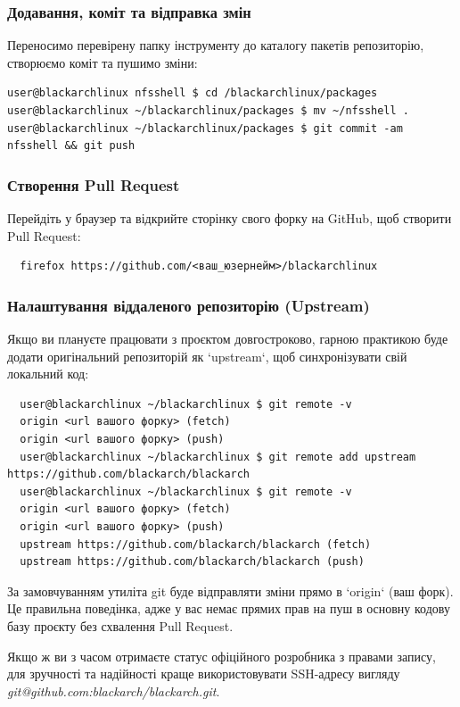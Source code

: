 \documentclass[a4paper, oneside, 11pt]{book}
\begin{document}
\subsubsection{Додавання, коміт та відправка змін}
Переносимо перевірену папку інструменту до каталогу пакетів репозиторію, створюємо коміт та пушимо зміни:
\begin{lstlisting}
user@blackarchlinux nfsshell $ cd /blackarchlinux/packages
user@blackarchlinux ~/blackarchlinux/packages $ mv ~/nfsshell .
user@blackarchlinux ~/blackarchlinux/packages $ git commit -am nfsshell && git push
\end{lstlisting}

\subsubsection{Створення Pull Request}
Перейдіть у браузер та відкрийте сторінку свого форку на GitHub, щоб створити Pull Request:
\begin{lstlisting}
  firefox https://github.com/<ваш_юзернейм>/blackarchlinux
\end{lstlisting}

\subsubsection{Налаштування віддаленого репозиторію (Upstream)}
Якщо ви плануєте працювати з проєктом довгостроково, гарною практикою буде додати оригінальний репозиторій як `upstream`, щоб синхронізувати свій локальний код:
\begin{lstlisting}
  user@blackarchlinux ~/blackarchlinux $ git remote -v
  origin <url вашого форку> (fetch)
  origin <url вашого форку> (push)
  user@blackarchlinux ~/blackarchlinux $ git remote add upstream https://github.com/blackarch/blackarch
  user@blackarchlinux ~/blackarchlinux $ git remote -v
  origin <url вашого форку> (fetch)
  origin <url вашого форку> (push)
  upstream https://github.com/blackarch/blackarch (fetch)
  upstream https://github.com/blackarch/blackarch (push)
\end{lstlisting}

За замовчуванням утиліта git буде відправляти зміни прямо в `origin` (ваш форк). Це правильна поведінка, адже у вас немає прямих прав на пуш в основну кодову базу проєкту без схвалення Pull Request.

Якщо ж ви з часом отримаєте статус офіційного розробника з правами запису, для зручності та надійності краще використовувати SSH-адресу вигляду \textit{git@github.com:blackarch/blackarch.git}.
\end{document}

